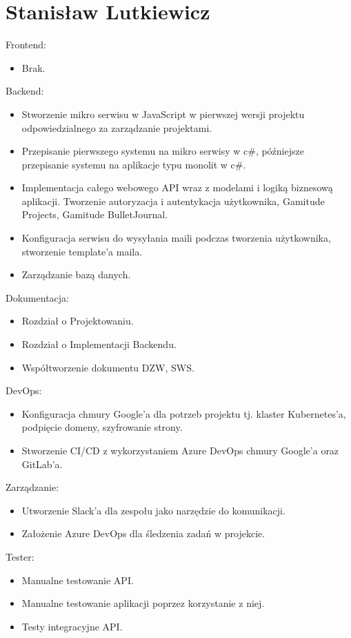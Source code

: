 \documentclass[a4paper,11pt]{report}
\begin{document}
\section {Stanisław Lutkiewicz}
Frontend:
\begin{itemize}
	\item Brak.
\end{itemize}
Backend:
\begin{itemize}
	\item Stworzenie mikro serwisu w JavaScript w pierwszej wersji projektu odpowiedzialnego za zarządzanie projektami. 
	\item Przepisanie pierwszego systemu na mikro serwisy w c\#, późniejsze przepisanie systemu na aplikacje typu monolit w c\#.
	\item Implementacja całego webowego API wraz z modelami i logiką biznesową aplikacji.
	Tworzenie autoryzacja i autentykacja użytkownika, Gamitude Projects, Gamitude BulletJournal.
	\item Konfiguracja serwisu do wysyłania maili podczas tworzenia użytkownika, stworzenie template'a maila.
	\item Zarządzanie bazą danych.
\end{itemize}
Dokumentacja:
\begin{itemize}
	\item Rozdział o Projektowaniu.
	\item Rozdział o Implementacji Backendu.
	\item Współtworzenie dokumentu DZW, SWS.
\end{itemize}
DevOps:
\begin{itemize}
	\item Konfiguracja chmury Google'a dla potrzeb projektu tj. klaster Kubernetes'a, podpięcie domeny, szyfrowanie strony.
	\item Stworzenie CI/CD z wykorzystaniem Azure DevOps chmury Google'a oraz GitLab'a. 
\end{itemize}
Zarządzanie:
\begin{itemize}
	\item Utworzenie Slack'a dla zespołu jako narzędzie do komunikacji.
	\item Założenie Azure DevOps dla śledzenia zadań w projekcie.
\end{itemize}
Tester:
\begin{itemize}
	\item Manualne testowanie API.
	\item Manualne testowanie aplikacji poprzez korzystanie z niej.
	\item Testy integracyjne API.
\end{itemize}
\end{document}
